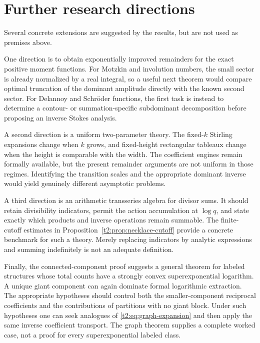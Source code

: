 \documentclass[11pt,openany]{book}
\numberwithin{equation}{chapter}
\theoremstyle{plain}
\theoremstyle{definition}
\theoremstyle{remark}
\begin{document}
\section{Further research directions}

Several concrete extensions are suggested by the results, but are not used as premises above.

One direction is to obtain exponentially improved remainders for the exact positive moment functions. For Motzkin and involution numbers, the small sector is already normalized by a real integral, so a useful next theorem would compare optimal truncation of the dominant amplitude directly with the known second sector. For Delannoy and Schr\"oder functions, the first task is instead to determine a contour- or summation-specific subdominant decomposition before proposing an inverse Stokes analysis.

A second direction is a uniform two-parameter theory. The fixed-$k$ Stirling expansions change when $k$ grows, and fixed-height rectangular tableaux change when the height is comparable with the width. The coefficient engines remain formally available, but the present remainder arguments are not uniform in those regimes. Identifying the transition scales and the appropriate dominant inverse would yield genuinely different asymptotic problems.

A third direction is an arithmetic transseries algebra for divisor sums. It should retain divisibility indicators, permit the action accumulation at $\log q$, and state exactly which products and inverse operations remain summable. The finite-cutoff estimates in Proposition~\ref{t2:prop:necklace-cutoff} provide a concrete benchmark for such a theory. Merely replacing indicators by analytic expressions and summing indefinitely is not an adequate definition.

Finally, the connected-component proof suggests a general theorem for labeled structures whose total counts have a strongly convex superexponential logarithm. A unique giant component can again dominate formal logarithmic extraction. The appropriate hypotheses should control both the smaller-component reciprocal coefficients and the contributions of partitions with no giant block. Under such hypotheses one can seek analogues of \eqref{t2:eq:graph-expansion} and then apply the same inverse coefficient transport. The graph theorem supplies a complete worked case, not a proof for every superexponential labeled class.
\end{document}
